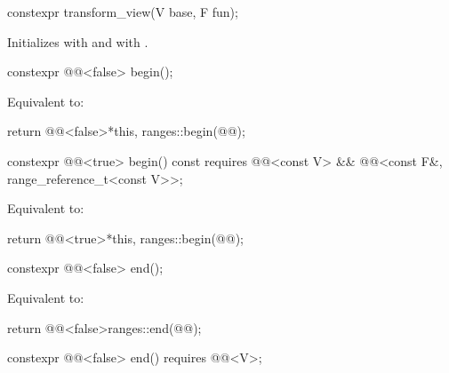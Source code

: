 %
\begin{itemdecl}
constexpr transform_view(V base, F fun);
\end{itemdecl}

\begin{itemdescr}
\pnum
\effects
Initializes  with  and
 with .
\end{itemdescr}

%
\begin{itemdecl}
constexpr @@<false> begin();
\end{itemdecl}

\begin{itemdescr}
\pnum
\effects
Equivalent to:
\begin{codeblock}
return @@<false>{*this, ranges::begin(@@)};
\end{codeblock}
\end{itemdescr}

%
\begin{itemdecl}
constexpr @@<true> begin() const
  requires @@<const V> &&
           @@<const F&, range_reference_t<const V>>;
\end{itemdecl}

\begin{itemdescr}
\pnum
\effects
Equivalent to:
\begin{codeblock}
return @@<true>{*this, ranges::begin(@@)};
\end{codeblock}
\end{itemdescr}

%
\begin{itemdecl}
constexpr @@<false> end();
\end{itemdecl}

\begin{itemdescr}
\pnum
\effects
Equivalent to:
\begin{codeblock}
return @@<false>{ranges::end(@@)};
\end{codeblock}
\end{itemdescr}

%
\begin{itemdecl}
constexpr @@<false> end() requires @@<V>;
\end{itemdecl}

